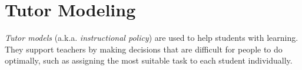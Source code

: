 
\section{Tutor Modeling}
\label{sec:tutor-modeling}

\emph{Tutor models} (a.k.a. \emph{instructional policy})
\cite[ch.\,7]{its-review-2010}
are used to help students with learning.
They support teachers by making decisions that are difficult for people
to do optimally, %
such as assigning the most suitable task to each student individually.

